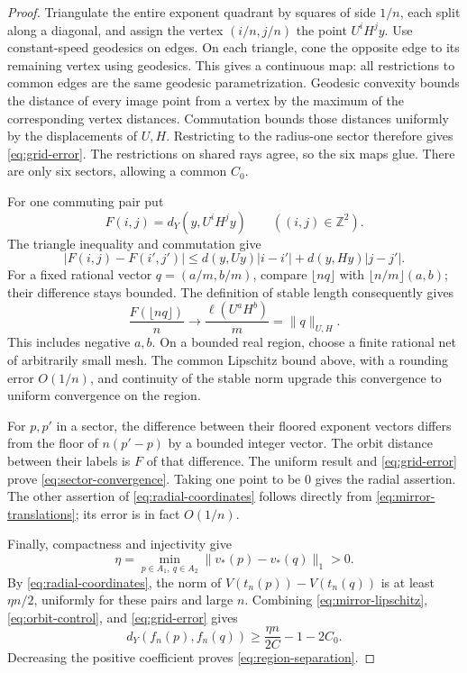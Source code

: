 \begin{proof}
Triangulate the entire exponent quadrant by squares of side \(1/n\),
each split along a diagonal, and assign the vertex \((i/n,j/n)\) the
point \(U^iH^j y\).  Use constant-speed geodesics on edges.  On each
triangle, cone the opposite edge to its remaining vertex using geodesics.
This gives a continuous map: all restrictions to common edges are the
same geodesic parametrization.  Geodesic convexity bounds the distance
of every image point from a vertex by the maximum of the corresponding
vertex distances.  Commutation bounds those distances uniformly by
the displacements of \(U,H\).  Restricting to the radius-one sector
therefore gives \eqref{eq:grid-error}.  The restrictions on shared rays
agree, so the six maps glue.  There are only six sectors, allowing a
common \(C_0\).

For one commuting pair put
\[
 F(i,j)=d_Y(y,U^iH^j y)\qquad((i,j)\in\mathbb Z^2).
\]
The triangle inequality and commutation give
\[
 |F(i,j)-F(i',j')|
 \le d(y,Uy)|i-i'|+d(y,Hy)|j-j'|.
\]
For a fixed rational vector \(q=(a/m,b/m)\), compare
\(\lfloor nq\rfloor\) with
\(\lfloor n/m\rfloor(a,b)\); their difference stays bounded.
The definition of stable length consequently gives
\[
 \frac{F(\lfloor nq\rfloor)}n
 \longrightarrow\frac{\ell(U^aH^b)}m=\|q\|_{U,H}.
\]
This includes negative \(a,b\).  On a bounded real region, choose a
finite rational net of arbitrarily small mesh.  The common Lipschitz
bound above, with a rounding error \(O(1/n)\), and continuity of the
stable norm upgrade this convergence to uniform convergence on the
region.

For \(p,p'\) in a sector, the difference between their floored exponent
vectors differs from the floor of \(n(p'-p)\) by a bounded integer
vector.  The orbit distance between their labels is \(F\) of that
difference.  The uniform result and \eqref{eq:grid-error} prove
\eqref{eq:sector-convergence}.  Taking one point to be \(0\) gives the
radial assertion.  The other assertion of \eqref{eq:radial-coordinates}
follows directly from \eqref{eq:mirror-translations}; its error is
in fact \(O(1/n)\).

Finally, compactness and injectivity give
\[
 \eta=\min_{p\in A_1,\ q\in A_2}\|v_*(p)-v_*(q)\|_1>0.
\]
By \eqref{eq:radial-coordinates}, the norm of
\(V(t_n(p))-V(t_n(q))\) is at least \(\eta n/2\), uniformly for these
pairs and large \(n\).  Combining \eqref{eq:mirror-lipschitz},
\eqref{eq:orbit-control}, and \eqref{eq:grid-error} gives
\[
 d_Y(f_n(p),f_n(q))
 \ge\frac{\eta n}{2C}-1-2C_0.
\]
Decreasing the positive coefficient proves
\eqref{eq:region-separation}.
\end{proof}


